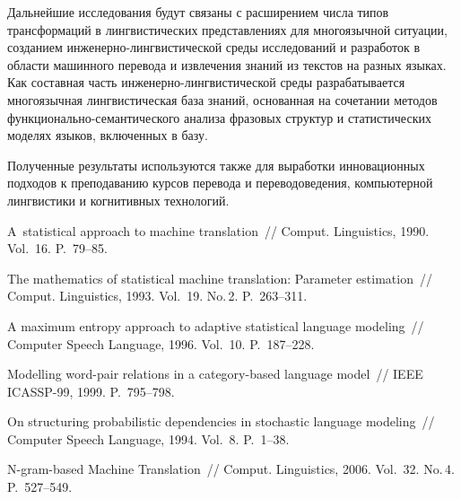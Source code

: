 \begin{multicols}{2}
     Дальнейшие исследования будут связаны с расширением числа типов 
трансформаций в линг\-ви\-сти\-че\-ских представлениях для многоязычной 
ситуации, созданием инженерно-лингвистической\linebreak
 среды исследований и 
разработок в области машинного перевода и извлечения знаний из текстов на 
разных языках. Как составная часть инженерно-лингвистической среды 
разрабатывается многоязычная лингвистическая база знаний, основанная на 
сочетании методов функционально-се\-ман\-ти\-че\-ского анализа фразовых 
структур и статистических моделях языков, включенных в базу.
     
     Полученные результаты используются также для выработки 
инновационных подходов к преподаванию курсов перевода и 
переводоведения, компьютерной лингвистики и когнитивных технологий.


{\small\frenchspacing
{%
\begin{thebibliography}{99}      
      
    A~statistical approach to machine translation~// Comput. Linguistics, 
1990. Vol.~16. P.~79--85.
    
    The mathematics of statistical machine translation: Parameter estimation~// 
Comput. Linguistics, 1993. Vol.~19. No.\,2. P.~263--311.
    
    A maximum entropy approach to adaptive statistical language modeling~// 
Computer Speech Language, 1996. Vol.~10. P.~187--228. 
    
    Modelling word-pair relations in a category-based language model~// IEEE 
ICASSP-99, 1999. P.~795--798.
    
    On structuring probabilistic dependencies in stochastic language modeling~// 
Computer Speech Language, 1994. Vol.~8. P.~1--38.
    
    N-gram-based Machine Translation~// Comput. Linguistics, 2006. 
Vol.~32. No.\,4. P.~527--549.
    

\end{thebibliography}}}
\end{multicols}

